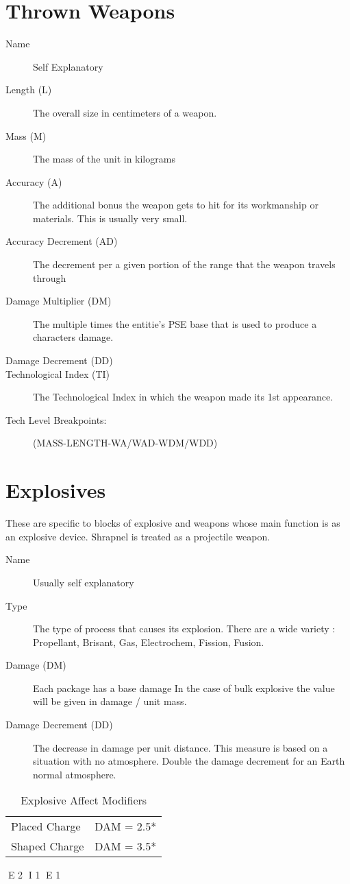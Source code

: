 \clearpage
\section{Thrown Weapons}

\begin{description}
	\item[Name]
	Self Explanatory
	\item[Length (L)]
	The overall size in centimeters of a weapon.
	\item[Mass (M)]
	The mass of the unit in kilograms
	\item[Accuracy (A)]
	The additional bonus the weapon gets to hit for its workmanship or
	materials. This is usually very small.
	\item[Accuracy Decrement (AD)]
	The decrement per a given portion of the range that the weapon travels through
	\item[Damage Multiplier (DM)]
	The multiple times the entitie's PSE base that is used to produce a characters
	damage.
	\item[Damage Decrement (DD)]
	\item[Technological Index (TI)]
	The Technological Index in which the weapon made its 1st appearance.
	\item[Tech Level Breakpoints:]
	(MASS-LENGTH-WA/WAD-WDM/WDD)
\end{description}

\clearpage
\section{Explosives}

These are specific to blocks of explosive and weapons whose main 
function is as an explosive device. Shrapnel is treated as a
projectile weapon.

\begin{description}
	\item[Name]
	Usually self explanatory
	\item[Type ]
	The type of process that causes its explosion. There are a wide 
	variety : Propellant, Brisant, Gas, Electrochem, Fission, Fusion.
	\item[Damage (DM)]
	Each package has a base damage In the case of bulk explosive the value
	will be given in damage / unit mass. 
	\item[Damage Decrement (DD)]
	The decrease in damage per unit distance. This measure is based on 
	a situation with no atmosphere. Double the damage decrement for an 
	Earth normal atmosphere. 
\end{description}

\begin{table}[h]
\centering
\caption{Explosive Affect Modifiers}
	\begin{tabular}{ll} \hline
		Placed Charge  & DAM = 2.5* \\
		Shaped Charge  & DAM = 3.5* \\ \hline
	\end{tabular}
\end{table}



E 2
I 1
E 1
